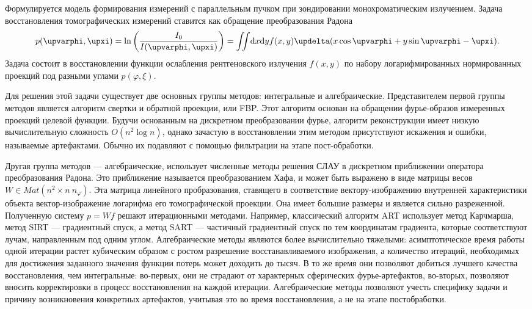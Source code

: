 Формулируется модель формирования измерений с параллельным пучком при зондировании монохроматическим излучением. 
Задача восстановления томографических измерений ставится как обращение преобразования Радона 
\begin{equation}\notag
  p(\varphi, \xi) = \ln \left (\frac{I_0}{I(\varphi, \xi)} \right) = 
 \iint \! \mathrm d x \mathrm d y f(x,y)\delta(x\cos\varphi + y\sin\varphi - \xi).
\end{equation}
Задача состоит в восстановлении функции ослабления рентгеновского излучения $f(x,y)$ по набору логарифмированных нормированных проекций под разными углами $p(\varphi, \xi)$.

Для решения этой задачи существует две основных группы методов: интегральные и алгебраические.
Представителем первой группы методов является алгоритм свертки и обратной проекции, или FBP. 
Этот алгоритм основан на обращении фурье-образов измеренных проекций целевой функции.
Будучи основанным на дискретном преобразовании фурье, алгоритм реконструкции имеет низкую вычислительную сложность $O(n^2 \log n)$, однако зачастую в восстановлении этим методом присутствуют искажения и ошибки, называемые артефактами.
Обычно их подавляют с помощью фильтрации на этапе пост-обработки.

Другая группа методов --- алгебраические, использует численные методы решения СЛАУ в дискретном приближении оператора преобразования Радона.
Это приближение называется преобразованием Хафа, и может быть выражено в виде матрицы весов $W \in Mat\left(n^2 \times n ~ n_\varphi\right)$.
Эта матрица линейного пробразования, ставящего в соответствие вектору-изображению внутренней характеристики объекта вектор-изображение логарифма его томографической проекции.
Она имеет большие размеры и является сильно разреженной.
Полученную систему $p = Wf$ решают итерационными методами.
Например, классический алгоритм ART использует метод Карчмарша, метод SIRT --- градиентный спуск, а метод SART --- частичный градиентный спуск по тем координатам градиента, которые соответствуют лучам, направленным под одним углом.
Алгебраические методы являются более вычислительно тяжелыми:
асимптотическое время работы одной итерации растет кубическим образом с ростом разрешение восстанавливаемого изображения, а количество итераций, необходимых для достижения заданного значения функции потерь может доходить до тысяч.
В то же время они позволяют добиться лучшего качества восстановления, чем интегральные: во-первых, они не страдают от характерных сферических фурье-артефактов, во-вторых, позволяют вносить корректировки в процесс восстановления на каждой итерации.
Алгебраические методы позволяют учесть специфику задачи и причину возникновения конкретных артефактов, учитывая это во время восстановления, а не на этапе постобработки.


